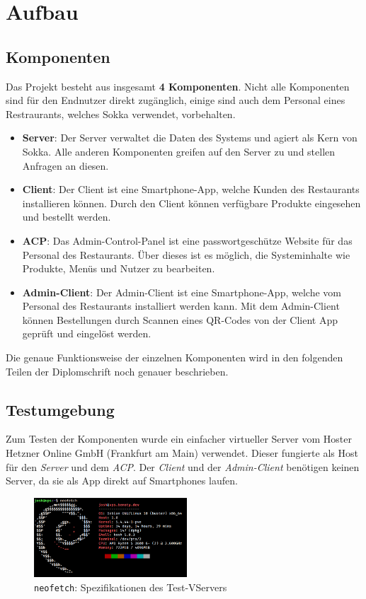 \chapter{Aufbau}

\section{Komponenten}

Das Projekt besteht aus insgesamt \textbf{4 Komponenten}. Nicht alle Komponenten sind für den Endnutzer direkt zugänglich, einige sind auch dem Personal eines Restraurants, welches Sokka verwendet, vorbehalten.

\begin{itemize}
    \item \textbf{Server}: Der Server verwaltet die Daten des Systems und agiert als Kern von Sokka. Alle anderen Komponenten greifen auf den Server zu und stellen Anfragen an diesen.
    \item \textbf{Client}: Der Client ist eine Smartphone-App, welche Kunden des Restaurants installieren können. Durch den Client können verfügbare Produkte eingesehen und bestellt werden.
    \item \textbf{ACP}: Das Admin-Control-Panel ist eine passwortgeschütze Website für das Personal des Restaurants. Über dieses ist es möglich, die Systeminhalte wie Produkte, Menüs und Nutzer zu bearbeiten.
    \item \textbf{Admin-Client}: Der Admin-Client ist eine Smartphone-App, welche vom Personal des Restaurants installiert werden kann. Mit dem Admin-Client können Bestellungen durch Scannen eines QR-Codes von der Client App geprüft und eingelöst werden.
\end{itemize}

Die genaue Funktionsweise der einzelnen Komponenten wird in den folgenden Teilen der Diplomschrift noch genauer beschrieben.

\section{Testumgebung}

Zum Testen der Komponenten wurde ein einfacher virtueller Server vom Hoster Hetzner Online GmbH (Frankfurt am Main) verwendet. Dieser fungierte als Host für den \textit{Server} und dem \textit{ACP}. Der \textit{Client} und der \textit{Admin-Client} benötigen keinen Server, da sie als App direkt auf Smartphones laufen.

\begin{figure}[ht]
    \centering
    \includegraphics[width=0.51\textwidth]{images/Intro/specs.png}
    \caption{\lstinline{neofetch}: Spezifikationen des Test-VServers}
\end{figure}

